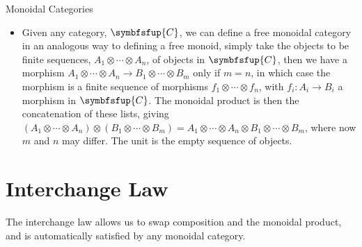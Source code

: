 \documentclass[fleqn]{NotesClass}
\newcommand{\cat}[1]{\symbfsfup{#1}}
\begin{document}
\begin{exm}{Monoidal Categories}{}
\begin{itemize}
            \item Given any category, \(\cat{C}\), we can define a free monoidal category in an analogous way to defining a free monoid, simply take the objects to be finite sequences, \(A_1 \otimes \dotsb \otimes A_n\), of objects in \(\cat{C}\), then we have a morphism \(A_1\otimes \dotsb \otimes A_n \to B_1 \otimes \dotsb \otimes B_m\) only if \(m = n\), in which case the morphism is a finite sequence of morphisms \(f_1 \otimes \dotsb \otimes f_n\), with \(f_i \colon A_i \to B_i\) a morphism in \(\cat{C}\).
            The monoidal product is then the concatenation of these lists, giving \((A_1 \otimes \dotsb \otimes A_n) \otimes (B_1 \otimes \dotsb \otimes B_m) = A_1 \otimes \dotsb \otimes A_n \otimes B_1 \otimes \dotsb \otimes B_m\), where now \(m\) and \(n\) may differ.
            The unit is the empty sequence of objects.
        \end{itemize}
    \end{exm}
    
    \section{Interchange Law}
    The interchange law allows us to swap composition and the monoidal product, and is automatically satisfied by any monoidal category.
    
\end{document}
